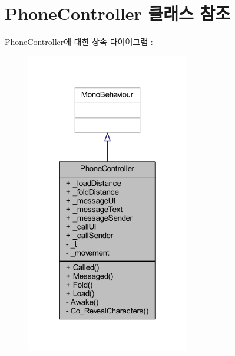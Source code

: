 \hypertarget{class_phone_controller}{}\section{Phone\+Controller 클래스 참조}
\label{class_phone_controller}


Phone\+Controller에 대한 상속 다이어그램 \+: \nopagebreak
\begin{figure}[H]
\begin{center}
\leavevmode
\includegraphics[width=202pt]{d0/d64/class_phone_controller__inherit__graph}
\end{center}
\end{figure}


